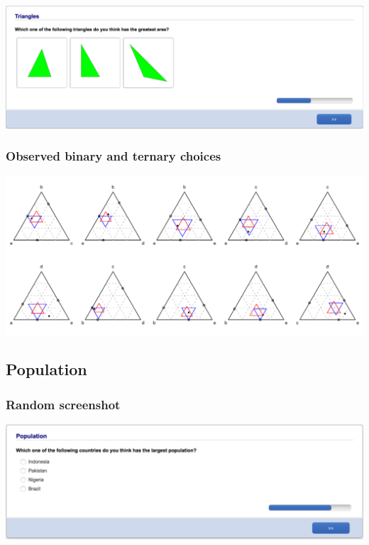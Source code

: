 \documentclass[11pt,letter]{article}
\begin{document}
\includegraphics[width=15cm]{Population_study_design/screenshot_triangles.png}

\subsubsection*{Observed binary and ternary choices}

\includegraphics[width=15cm]{./Population_study_data/Simplexes/triangles.pdf}

\pagebreak

\subsection*{Population}



\subsubsection*{Random screenshot}

\includegraphics[width=15cm]{Population_study_design/screenshot_population.png}
\end{document}
